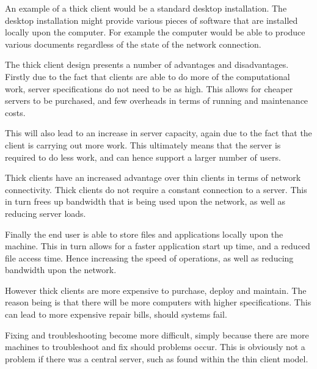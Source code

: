 An example of a thick client would be a standard desktop installation. The 
desktop installation might provide various pieces of software that are 
installed locally upon the computer. For example the computer would be able to 
produce various documents regardless of the state of the network connection.

The thick client design presents a number of advantages and disadvantages. 
Firstly due to the fact that clients are able to do more of the computational 
work, server specifications do not need to be as high. This allows for cheaper 
servers to be purchased, and few overheads in terms of running and maintenance 
costs.

This will also lead to an increase in server capacity, again due to the fact 
that the client is carrying out more work. This ultimately means that the 
server is required to do less work, and can hence support a larger number of 
users.

Thick clients have an increased advantage over thin clients in terms of 
network connectivity. Thick clients do not require a constant connection to a 
server. This in turn frees up bandwidth that is being used upon the network, 
as well as reducing server loads.

Finally the end user is able to store files and applications locally upon the
machine. This in turn allows for a faster application start up time, and a 
reduced file access time. Hence increasing the speed of operations, as well as 
reducing bandwidth upon the network.

However thick clients are more expensive to purchase, deploy and maintain. The 
reason being is that there will be more computers with higher specifications. 
This can lead to more expensive repair bills, should systems fail.

Fixing and troubleshooting become more difficult, simply because there are more
machines to troubleshoot and fix should problems occur. This is obviously not a
problem if there was a central server, such as found within the thin client 
model. 